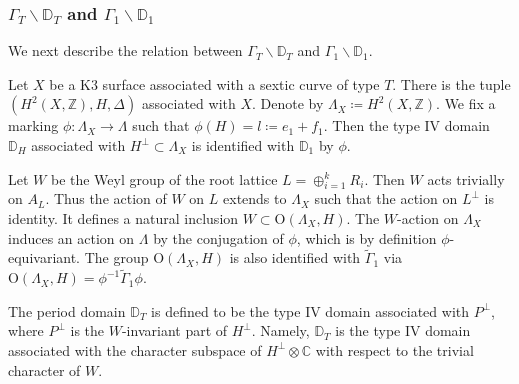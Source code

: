 \documentclass[12pt,reqno,a4paper]{amsart}
\theoremstyle{remark}
\theoremstyle{definition}
\begin{document}
\subsubsection{$\Gamma_T\backslash\mathbb{D}_T$ and $\Gamma_1\backslash\mathbb{D}_1$}
We next describe the relation between $\Gamma_T\backslash\mathbb{D}_T$ and $\Gamma_1\backslash\mathbb{D}_1$.

Let $X$ be a K3 surface associated with a sextic curve of type $T$. 
There is the tuple $(H^2(X,\mathbb{Z}),H,\Delta)$ associated with $X$.
Denote by $\Lambda_X\coloneqq H^2(X,\mathbb{Z})$.
We fix a marking $\phi\colon \Lambda_X\to\Lambda$ such that $\phi(H)=l\coloneqq e_1+f_1$.
Then the type IV domain $\mathbb{D}_H$ associated with $H^\perp\subset \Lambda_X$ is identified with $\mathbb{D}_1$ by $\phi$.

Let $W$ be the Weyl group of the root lattice $L=\oplus_{i=1}^k R_i$. Then $W$ acts trivially on $A_L$.
Thus the action of $W$ on $L$ extends to $\Lambda_X$ such that the action on $L^\perp$ is identity.
It defines a natural inclusion $W\subset\mathrm{O}(\Lambda_X,H)$.
The $W$-action on $\Lambda_X$ induces an action on $\Lambda$ by the conjugation of $\phi$, which is by definition $\phi$-equivariant.
The group $\mathrm{O}(\Lambda_X,H)$ is also identified with $\widetilde\Gamma_1$ via $\mathrm{O}(\Lambda_X,H) = \phi^{-1}\widetilde\Gamma_1\phi$.


The period domain $\mathbb{D}_T$ is defined to be the type IV domain associated with $P^\perp$, where $P^\perp$ is the $W$-invariant part of $H^{\perp}$.
Namely, $\mathbb{D}_T$ is the type IV domain associated with the character subspace of $H^\perp\otimes\mathbb{C}$ with respect to the trivial character of $W$.
\end{document}

